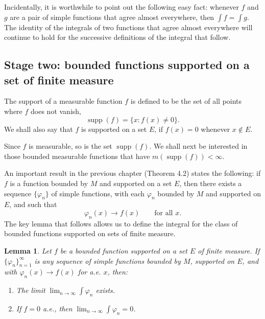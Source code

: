 \documentclass[11pt,openany]{book}
\newtheorem{lemma}[theorem]{Lemma}
\begin{document}
Incidentally, it is worthwhile to point out the following easy fact: whenever $f$ and $g$ are a pair of simple functions that agree almost everywhere, then $\int f=\int g$. The identity of the integrals of two functions that agree almost everywhere will continue to hold for the successive definitions of the integral that follow.

\subsection*{Stage two: bounded functions supported on a set of finite measure}

The support of a measurable function $f$ is defined to be the set of all points where $f$ does not vanish,
\[
\operatorname{supp}(f)=\{x:f(x)\neq0\}.
\]
We shall also say that $f$ is supported on a set $E$, if $f(x)=0$ whenever $x\notin E$.

Since $f$ is measurable, so is the set $\operatorname{supp}(f)$. We shall next be interested in those bounded measurable functions that have $m(\operatorname{supp}(f))<\infty$.

An important result in the previous chapter (Theorem 4.2) states the following: if $f$ is a function bounded by $M$ and supported on a set $E$, then there exists a sequence $\{\varphi_n\}$ of simple functions, with each $\varphi_n$ bounded by $M$ and supported on $E$, and such that
\[
\varphi_n(x)\to f(x)\qquad\text{for all }x.
\]
The key lemma that follows allows us to define the integral for the class of bounded functions supported on sets of finite measure.

\begin{lemma}
Let $f$ be a bounded function supported on a set $E$ of finite measure. If $\{\varphi_n\}_{n=1}^{\infty}$ is any sequence of simple functions bounded by $M$, supported on $E$, and with $\varphi_n(x)\to f(x)$ for a.e. $x$, then:
\begin{enumerate}
\item[(i)] The limit $\displaystyle \lim_{n\to\infty}\int\varphi_n$ exists.
\item[(ii)] If $f=0$ a.e., then $\displaystyle \lim_{n\to\infty}\int\varphi_n=0$.
\end{enumerate}
\end{lemma}
\end{document}
